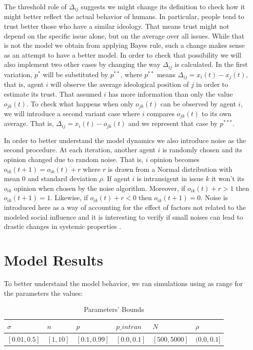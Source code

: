 \documentclass{article}
\begin{document}
The threshold role of $\Delta_{ij}$ suggests we might change its definition to
check how it might better reflect the actual behavior of humans. In particular,
people tend to trust better those who have a similar ideology. That means trust
might not depend on the specific issue alone, but on the average over all
issues. While that is not the model we obtain from applying Bayes rule, such a
change makes sense as an attempt to have a better model. In order to check that
possibility we will also implement two other cases by changing the way
$\Delta_{ij}$ is calculated. In the first variation, $p^*$ will be substituted
by \(p^{**}\), where \(p^{**}\) means \(\Delta_{ij} = x_i(t) - x_j(t) \), that
is, agent $i$ will observe the average ideological position of $j$ in order to
estimate its trust. That assumed $i$ has more information than only the value
$o_{jk}(t)$. To check what happens when only $o_{jk}(t)$ can be observed by
agent $i$, we will introduce a second variant case where $i$ compares
$o_{jk}(t)$ to its own average. That is, \(\Delta_{ij} = x_{i}(t) - o_{jk}(t)\)
and we represent that case by \(p^{***}\).

In order to better understand the model dynamics we also introduce noise as the
second procedure. At each iteration, another agent \(i\) is randomly chosen and
its opinion changed due to random noise. That is, $i$ opinion becomes \(
o_{ik}(t+1) = o_{ik}(t) + r \) where \(r\) is drawn from a Normal distribution
with mean 0 and standard deviation \(\rho\). If agent \(i\) is intransigent in
issue \(k\) it won't its \(o_{ik}\) opinion when chosen by the noise algorithm.
Moreover, if \(o_{ik}(t) + r > 1\) then \( o_{ik}(t+1) = 1\). Likewise, if
\(o_{ik}(t) + r < 0 \) then \( o_{ik}(t+1) = 0\). Noise is introduced here as a
way of accounting for the effect of factors not related to the modeled social
influence \cite{flache2017} and it is interesting to verify if small noises can
lead to drastic changes in systemic properties \cite{macy2015signal}.

  \section{Model Results}

  To better understand the model behavior, we ran simulations using as range for
  the parameters the values:

  \begin{table}[H]
    \centering
\begin{tabular}{@{}|l|l|l|l|l|l|@{}}
\toprule
\rowcolor[HTML]{EFEFEF}
$\sigma$ & $n$ & $p$ & $p\_intran$ & $N$ & $\rho$ \\ \midrule
$[0.01, 0.5]$ & $[1, 10]$  & $[0.1, 0.99]$ & $[0.0, 0.1]$ & $[500, 5000]$ & $(0.0, 0.1]$ \\ \bottomrule
\end{tabular}
\caption{Parameters' Bounds}
\end{table}
\end{document}
